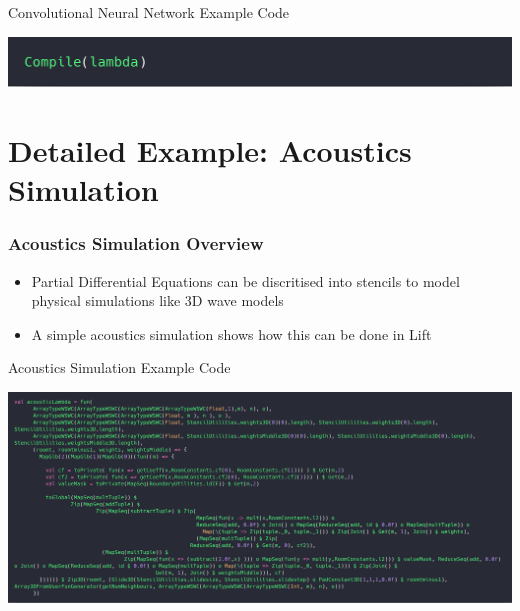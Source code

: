 \documentclass[10pt]{beamer}
\begin{document}
\begin{frame}{Convolutional Neural Network Example Code}
        \begin{block}{}
        \begin{center}
            \includegraphics[width=.5\textwidth]{../images/simpleCompile.png}
        \end{center}
        \end{block}
\end{frame}

\section{Detailed Example: Acoustics Simulation }

\begin{frame}
\frametitle{Acoustics Simulation Overview}
\vspace{.2cm}
\begin{itemize}
    \item Partial Differential Equations can be discritised into stencils to model physical simulations like 3D wave models 
    \item A simple acoustics simulation shows how this can be done in Lift 
\end{itemize}
\vspace{-1.2cm}
\end{frame}

\begin{frame}{Acoustics Simulation Example Code}
        \begin{block}{}
        \begin{center}
            \includegraphics[width=\textwidth]{../images/acousticLambda.png}
        \end{center}
        \end{block}
\end{frame}

\appendix
\end{document}
